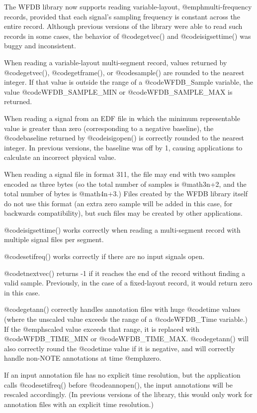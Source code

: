 {{{{{{{{The WFDB library now supports reading variable-layout, @emph{multi-frequency}
records, provided that each signal's sampling frequency is constant across the
entire record.  Although previous versions of the library were able to read
such records in some cases, the behavior of @code{getvec()} and
@code{isigsettime()} was buggy and inconsistent.

When reading a variable-layout multi-segment record, values returned by
@code{getvec()}, @code{getframe()}, or @code{sample()} are rounded to the
nearest integer.  If that value is outside the range of a @code{WFDB_Sample}
variable, the value @code{WFDB_SAMPLE_MIN} or @code{WFDB_SAMPLE_MAX} is
returned.

When reading a signal from an EDF file in which the minimum representable value
is greater than zero (corresponding to a negative baseline), the
@code{baseline} returned by @code{isigopen()} is correctly rounded to the
nearest integer.  In previous versions, the baseline was off by 1, causing
applications to calculate an incorrect physical value.

When reading a signal file in format 311, the file may end with two samples
encoded as three bytes (so the total number of samples is @math{3n+2}, and the
total number of bytes is @math{4n+3}.)  Files created by the WFDB library
itself do not use this format (an extra zero sample will be added in this case,
for backwards compatibility), but such files may be created by other
applications.

@code{isigsettime()} works correctly when reading a multi-segment record with
multiple signal files per segment.

@code{setifreq()} works correctly if there are no input signals open.

@code{tnextvec()} returns -1 if it reaches the end of the record without
finding a valid sample.  Previously, in the case of a fixed-layout record, it
would return zero in this case.

@code{getann()} correctly handles annotation files with huge @code{time} values
(where the unscaled value exceeds the range of a @code{WFDB_Time} variable.)
If the @emph{scaled} value exceeds that range, it is replaced with
@code{WFDB_TIME_MIN} or @code{WFDB_TIME_MAX}.  @code{getann()} will also
correctly round the @code{time} value if it is negative, and will correctly
handle non-NOTE annotations at time @emph{zero}.

If an input annotation file has no explicit time resolution, but the
application calls @code{setifreq()} before @code{annopen()}, the input
annotations will be rescaled accordingly.  (In previous versions of the
library, this would only work for annotation files with an explicit time
resolution.)

}}}}}}}}
